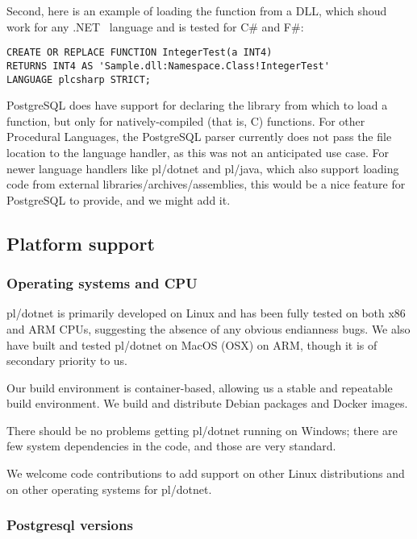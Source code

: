 \documentclass[sigconf,techreport,authorversion,nonacm]{acmart}
\newcommand{\dotnet}{.NET }
\begin{document}
Second, here is an example of loading the function from a DLL, which
shoud work for any \dotnet\ language and is tested for C\# and F\#:

\begin{listing}[H]
\begin{verbatim}
CREATE OR REPLACE FUNCTION IntegerTest(a INT4)
RETURNS INT4 AS 'Sample.dll:Namespace.Class!IntegerTest'
LANGUAGE plcsharp STRICT;
\end{verbatim}
\end{listing}

PostgreSQL does have support for declaring the library from which
to load a function, but only for natively-compiled (that is, C)
functions. For other Procedural Languages, the PostgreSQL parser
currently does not pass the file location to the language handler,
as this was not an anticipated use case. For newer language handlers
like pl/dotnet and pl/java, which also support loading code from
external libraries/archives/assemblies, this would be a nice feature
for PostgreSQL to provide, and we might add it.

\subsection{Platform support}

\subsubsection{Operating systems and CPU}

pl/dotnet is primarily developed on Linux and has been fully tested
on both x86 and ARM CPUs, suggesting the absence of any obvious
endianness bugs.  We also have built and tested pl/dotnet on MacOS
(OSX) on ARM, though it is of secondary priority to us.

Our build environment is container-based, allowing us a stable and
repeatable build environment. We build and distribute Debian
packages and Docker images.

There should be no problems getting pl/dotnet running on Windows;
there are few system dependencies in the code, and those are very
standard.

We welcome code contributions to add support on other Linux
distributions and on other operating systems for pl/dotnet.

\subsubsection{Postgresql versions}
\end{document}
